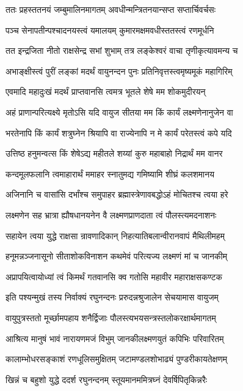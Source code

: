 \twolineshloka
{ततः प्रहस्ततनयं जम्बुमालिनमागतम्}
{अवधीन्मन्त्रितनयान्सप्त सप्तार्चिवर्चसः}%

\twolineshloka
{पञ्च सेनापतीन्पश्चादनयस्त्वं यमालयम्}
{कुमारमक्षमवधीस्ततस्त्वं रणमूर्धनि}%

\twolineshloka
{तत इन्द्रजिता नीतो राक्षसेन्द्र सभां शुभाम्}
{तत्र लङ्केश्वरं वाचा तृणीकृत्यावमन्य च}%

\twolineshloka
{अभाङ्क्षीस्त्वं पुरीं लङ्कां मदर्थं वायुनन्दन}
{पुनः प्रतिनिवृत्तस्त्वमृष्यमूकं महागिरिम्}%

\twolineshloka
{एवमादि महादुःखं मदर्थं प्राप्तवानसि}
{त्वमत्र भूतले शेषे मम शोकमुदीरयन्}%

\twolineshloka
{अहं प्राणान्परित्यक्ष्ये मृतोऽसि यदि वायुज}
{सीतया मम किं कार्यं लक्ष्मणेनानुजेन वा}%

\twolineshloka
{भरतेनापि किं कार्यं शत्रुघ्नेन श्रियापि वा}
{राज्येनापि न मे कार्यं परेतस्त्वं कपे यदि}%

\twolineshloka
{उत्तिष्ठ हनुमन्वत्स किं शेषेऽद्य महीतले}
{शय्यां कुरु महाबाहो निद्रार्थं मम वानर}%

\twolineshloka
{कन्दमूलफलानि त्वमाहारार्थं ममाहर}
{स्नातुमद्य गमिष्यामि शीघ्रं कलशमानय}%

\twolineshloka
{अजिनानि च वासांसि दर्भांश्च समुपाहर}
{ब्रह्मास्त्रेणावबद्धोऽहं मोचितश्च त्वया हरे}%

\twolineshloka
{लक्ष्मणेन सह भ्रात्रा ह्यौषधानयनेन वै}
{लक्ष्मणप्राणदाता त्वं पौलस्त्यमदनाशनः}%

\twolineshloka
{सहायेन त्वया युद्धे राक्षसा न्रावणादिकान्}
{निहत्यातिबलान्वीरानवापं मैथिलीमहम्}%

\twolineshloka
{हनूमन्नञ्जनासूनो सीताशोकविनाशन}
{कथमेवं परित्यज्य लक्ष्मणं मां च जानकीम्}%

\twolineshloka
{अप्रापयित्वायोध्यां त्वं किमर्थं गतवानसि}
{क्व गतोसि महावीर महाराक्षसकण्टक}%

\twolineshloka
{इति पश्यन्मुखं तस्य निर्वाक्यं रघुनन्दनः}
{प्ररुदन्नश्रुजालेन सेचयामास वायुजम्}%

\twolineshloka
{वायुपुत्रस्ततो मूर्च्छामपहाय शनैर्द्विजाः}
{पौलस्त्यभयसन्त्रस्तलोकरक्षार्थमागतम्}%

\twolineshloka
{आश्रित्य मानुषं भावं नारायणमजं विभुम्}
{जानकीलक्ष्मणयुतं कपिभिः परिवारितम्}%

\twolineshloka
{कालाम्भोधरसङ्काशं रणधूलिसमुक्षितम्}
{जटामण्डलशोभाढ्यं पुण्डरीकायतेक्षणम्}%

\twolineshloka
{खिन्नं च बहुशो युद्धे ददर्श रघुनन्दनम्}
{स्तूयमानममित्रघ्नं देवर्षिपितृकिन्नरैः}%

